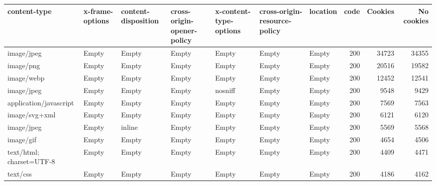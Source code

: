 \begin{tabular}{lllllllrrr}
\toprule
            content-type & x-frame-options & content-disposition & cross-origin-opener-policy & x-content-type-options & cross-origin-resource-policy & location &  code &  Cookies &  No cookies \\
\midrule
              image/jpeg &           Empty &               Empty &                      Empty &                  Empty &                        Empty &    Empty &   200 &    34723 &       34355 \\
               image/png &           Empty &               Empty &                      Empty &                  Empty &                        Empty &    Empty &   200 &    20516 &       19582 \\
              image/webp &           Empty &               Empty &                      Empty &                  Empty &                        Empty &    Empty &   200 &    12452 &       12541 \\
              image/jpeg &           Empty &               Empty &                      Empty &                nosniff &                        Empty &    Empty &   200 &     9548 &        9429 \\
  application/javascript &           Empty &               Empty &                      Empty &                  Empty &                        Empty &    Empty &   200 &     7569 &        7563 \\
           image/svg+xml &           Empty &               Empty &                      Empty &                  Empty &                        Empty &    Empty &   200 &     6121 &        6120 \\
              image/jpeg &           Empty &              inline &                      Empty &                  Empty &                        Empty &    Empty &   200 &     5569 &        5568 \\
               image/gif &           Empty &               Empty &                      Empty &                  Empty &                        Empty &    Empty &   200 &     4654 &        4506 \\
text/html; charset=UTF-8 &           Empty &               Empty &                      Empty &                  Empty &                        Empty &    Empty &   200 &     4409 &        4471 \\
                text/css &           Empty &               Empty &                      Empty &                  Empty &                        Empty &    Empty &   200 &     4186 &        4162 \\
\bottomrule
\end{tabular}
